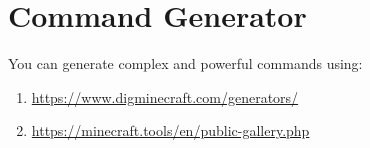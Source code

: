 \section{Command Generator}
You can generate complex and powerful commands using:
\begin{enumerate}
    \item \url{https://www.digminecraft.com/generators/}
    \item \url{https://minecraft.tools/en/public-gallery.php}
\end{enumerate}


